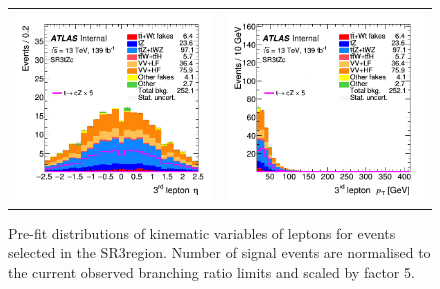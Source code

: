\begin{figure}[!htbp]
\begin{tabular}{cc}
		\includegraphics[width=.45\textwidth]{Chapters/CH6/figures/SR3_UsingSMT/lep3_eta} &
		\includegraphics[width=.45\textwidth]{Chapters/CH6/figures/SR3_UsingSMT/lep3_pt} \\
	\end{tabular}
	\caption{Pre-fit distributions of kinematic variables of leptons for events selected in the SR3\tZc region.  Number of signal events are normalised to the current observed branching ratio limits and scaled by factor 5. 
		\ErrStatOnly
		\Blinded
	}%
	\label{fig:sr3_kin_lep}
\end{figure}


